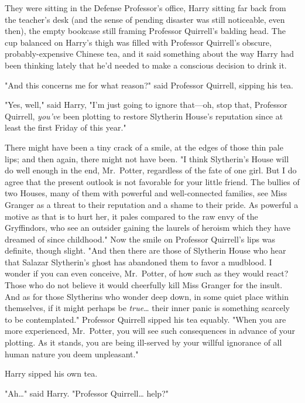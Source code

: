 They were sitting in the Defense Professor's office, Harry sitting far back 
from the teacher's desk (and the sense of pending disaster was still 
noticeable, even then), the empty bookcase still framing Professor Quirrell's 
balding head. The cup balanced on Harry's thigh was filled with Professor 
Quirrell's obscure, probably-expensive Chinese tea, and it said something about 
the way Harry had been thinking lately that he'd needed to make a conscious 
decision to drink it.

"And this concerns me for what reason?" said Professor Quirrell, sipping his 
tea.

"Yes, well," said Harry, "I'm just going to ignore that---oh, stop that, 
Professor Quirrell, \emph{you've} been plotting to restore Slytherin House's 
reputation since at least the first Friday of this year."

There might have been a tiny crack of a smile, at the edges of those thin pale 
lips; and then again, there might not have been. "I think Slytherin's House 
will do well enough in the end, Mr.~Potter, regardless of the fate of one girl. 
But I do agree that the present outlook is not favorable for your little 
friend. The bullies of two Houses, many of them with powerful and 
well-connected families, see Miss Granger as a threat to their reputation and a 
shame to their pride. As powerful a motive as that is to hurt her, it pales 
compared to the raw envy of the Gryffindors, who see an outsider gaining the 
laurels of heroism which they have dreamed of since childhood." Now the smile 
on Professor Quirrell's lips was definite, though slight. "And then there are 
those of Slytherin House who hear that Salazar Slytherin's ghost has abandoned 
them to favor a mudblood. I wonder if you can even conceive, Mr.~Potter, of how 
such as they would react? Those who do not believe it would cheerfully kill 
Miss Granger for the insult. And as for those Slytherins who wonder deep down, 
in some quiet place within themselves, if it might perhaps be 
\emph{true{\ldots}} their inner panic is something scarcely to be 
contemplated." Professor Quirrell sipped his tea equably. "When you are more 
experienced, Mr.~Potter, you will see such consequences in advance of your 
plotting. As it stands, you are being ill-served by your willful ignorance of 
all human nature you deem unpleasant."

Harry sipped his own tea.

"Ah{\ldots}" said Harry. "Professor Quirrell{\ldots} help?"

